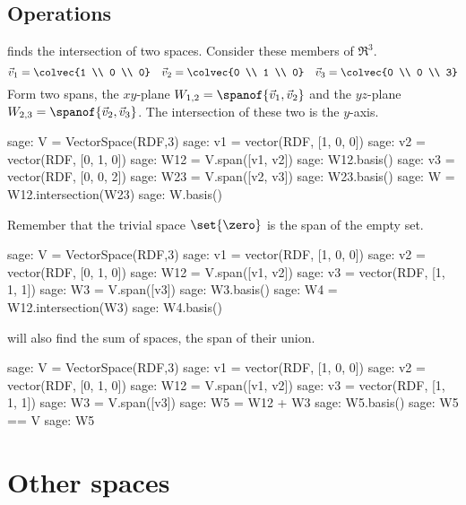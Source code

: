 \subsection{Operations}
\Sage{} finds the intersection of two spaces.
Consider these members of $\Re^3$.
\begin{equation*}
  \vec{v}_1=\colvec{1 \\ 0 \\ 0}
  \quad \vec{v}_2=\colvec{0 \\ 1 \\ 0}
  \quad \vec{v}_3=\colvec{0 \\ 0 \\ 3}
\end{equation*}
Form two spans, the $xy$-plane $W_{1,2}=\spanof{\vec{v}_1, \vec{v}_2}$ 
and the $yz$-plane $W_{2,3}=\spanof{\vec{v}_2, \vec{v}_3}$.
The intersection of these two is the $y$-axis. 
\begin{sagecommandline}
sage: V = VectorSpace(RDF,3)
sage: v1 = vector(RDF, [1, 0, 0])
sage: v2 =  vector(RDF, [0, 1, 0])
sage: W12 = V.span([v1, v2])
sage: W12.basis()
sage: v3 = vector(RDF, [0, 0, 2])
sage: W23 = V.span([v2, v3])
sage: W23.basis()
sage: W = W12.intersection(W23)
sage: W.basis()
\end{sagecommandline}

Remember that the trivial space $\set{\zero}$ is the span of the empty set.
\begin{sagecommandline}
sage: V = VectorSpace(RDF,3)
sage: v1 = vector(RDF, [1, 0, 0])
sage: v2 =  vector(RDF, [0, 1, 0])
sage: W12 = V.span([v1, v2])
sage: v3 = vector(RDF, [1, 1, 1])
sage: W3 = V.span([v3])
sage: W3.basis()
sage: W4 = W12.intersection(W3)
sage: W4.basis()
\end{sagecommandline}

\Sage{} will also find the sum of spaces, the span of their union.
\begin{sagecommandline}
sage: V = VectorSpace(RDF,3)
sage: v1 = vector(RDF, [1, 0, 0])
sage: v2 =  vector(RDF, [0, 1, 0])
sage: W12 = V.span([v1, v2])
sage: v3 = vector(RDF, [1, 1, 1])
sage: W3 = V.span([v3])
sage: W5 = W12 + W3
sage: W5.basis()
sage: W5 == V
sage: W5
\end{sagecommandline}






\section{Other spaces}

